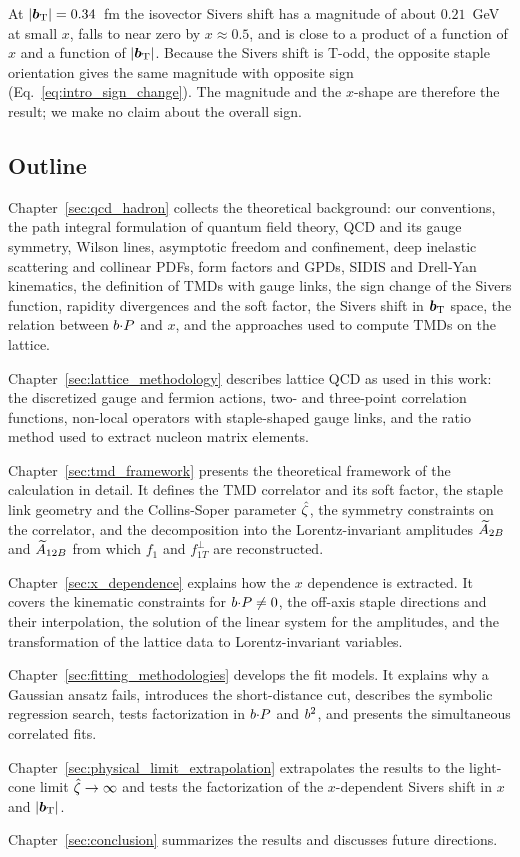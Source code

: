 At $|\boldsymbol{b}_{\mathrm T}|=0.34$~fm the isovector Sivers shift has a magnitude of about $0.21$~GeV at small $x$, falls to near zero by $x\approx0.5$, and is close to a product of a function of $x$ and a function of $|\boldsymbol{b}_{\mathrm T}|$. Because the Sivers shift is T-odd, the opposite staple orientation gives the same magnitude with opposite sign (Eq.~\eqref{eq:intro_sign_change}). The magnitude and the $x$-shape are therefore the result; we make no claim about the overall sign.

\subsection{Outline}
\label{sec:intro_outline}

Chapter~\ref{sec:qcd_hadron} collects the theoretical background: our conventions, the path integral formulation of quantum field theory, QCD and its gauge symmetry, Wilson lines, asymptotic freedom and confinement, deep inelastic scattering and collinear PDFs, form factors and GPDs, SIDIS and Drell-Yan kinematics, the definition of TMDs with gauge links, the sign change of the Sivers function, rapidity divergences and the soft factor, the Sivers shift in $\boldsymbol{b}_{\mathrm T}$ space, the relation between $b{\cdot} P$ and $x$, and the approaches used to compute TMDs on the lattice.

Chapter~\ref{sec:lattice_methodology} describes lattice QCD as used in this work: the discretized gauge and fermion actions, two- and three-point correlation functions, non-local operators with staple-shaped gauge links, and the ratio method used to extract nucleon matrix elements.

Chapter~\ref{sec:tmd_framework} presents the theoretical framework of the calculation in detail. It defines the TMD correlator and its soft factor, the staple link geometry and the Collins-Soper parameter ${\hat \zeta}$, the symmetry constraints on the correlator, and the decomposition into the Lorentz-invariant amplitudes $\widetilde{A}_{2B}$ and $\widetilde{A}_{12B}$ from which $f_1$ and $f_{1T}^\perp$ are reconstructed.

Chapter~\ref{sec:x_dependence} explains how the $x$ dependence is extracted. It covers the kinematic constraints for $b{\cdot} P\neq 0$, the off-axis staple directions and their interpolation, the solution of the linear system for the amplitudes, and the transformation of the lattice data to Lorentz-invariant variables.

Chapter~\ref{sec:fitting_methodologies} develops the fit models. It explains why a Gaussian ansatz fails, introduces the short-distance cut, describes the symbolic regression search, tests factorization in $b{\cdot} P$ and $b^2$, and presents the simultaneous correlated fits.

Chapter~\ref{sec:physical_limit_extrapolation} extrapolates the results to the light-cone limit ${\hat \zeta}\to\infty$ and tests the factorization of the $x$-dependent Sivers shift in $x$ and $|\boldsymbol{b}_{\mathrm T}|$.

Chapter~\ref{sec:conclusion} summarizes the results and discusses future directions.
